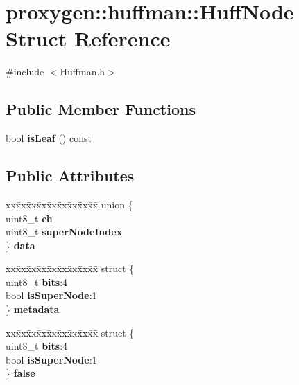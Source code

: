 \section{proxygen\+:\+:huffman\+:\+:Huff\+Node Struct Reference}
\label{structproxygen_1_1huffman_1_1HuffNode}


{\ttfamily \#include $<$Huffman.\+h$>$}

\subsection*{Public Member Functions}
\begin{DoxyCompactItemize}
\item 
bool {\bf is\+Leaf} () const 
\end{DoxyCompactItemize}
\subsection*{Public Attributes}
\begin{DoxyCompactItemize}
\item 
\begin{tabbing}
xx\=xx\=xx\=xx\=xx\=xx\=xx\=xx\=xx\=\kill
union \{\\
\>uint8\_t {\bf ch}\\
\>uint8\_t {\bf superNodeIndex}\\
\} {\bf data}\\

\end{tabbing}\item 
\begin{tabbing}
xx\=xx\=xx\=xx\=xx\=xx\=xx\=xx\=xx\=\kill
struct \{\\
\>uint8\_t {\bf bits}:4\\
\>bool {\bf isSuperNode}:1\\
\} {\bf metadata}\\

\end{tabbing}\item 
\begin{tabbing}
xx\=xx\=xx\=xx\=xx\=xx\=xx\=xx\=xx\=\kill
struct \{\\
\>uint8\_t {\bf bits}:4\\
\>bool {\bf isSuperNode}:1\\
\} {\bf false}\\

\end{tabbing}\end{DoxyCompactItemize}


